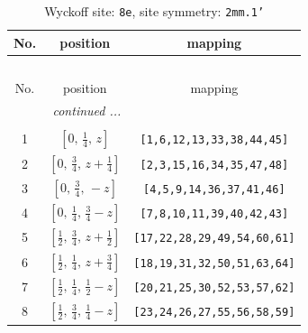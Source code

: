 \documentclass[fleqn,8pt]{jsarticle}
\begin{document}
\begin{longtable}{ccc}
\caption{Wyckoff site: {\tt 8e}, site symmetry: {\tt 2mm.1'}}
 \\
 \hline \hline
No. & position & mapping \\ \hline \endfirsthead

\multicolumn{2}{l}{\tablename\ \thetable{}} \\
 \hline \hline
No. & position & mapping \\ \hline \endhead

 \hline \hline
\multicolumn{2}{r}{\footnotesize\it continued ...} \\ \endfoot

 \hline \hline
\multicolumn{2}{r}{} \\ \endlastfoot

1 & $\left[ 0,\, \frac{1}{4},\, z \right]$ & {\tt [1,6,12,13,33,38,44,45]} \\ \hline
2 & $\left[ 0,\, \frac{3}{4},\, z + \frac{1}{4} \right]$ & {\tt [2,3,15,16,34,35,47,48]} \\ \hline
3 & $\left[ 0,\, \frac{3}{4},\, - z \right]$ & {\tt [4,5,9,14,36,37,41,46]} \\ \hline
4 & $\left[ 0,\, \frac{1}{4},\, \frac{3}{4} - z \right]$ & {\tt [7,8,10,11,39,40,42,43]} \\ \hline
5 & $\left[ \frac{1}{2},\, \frac{3}{4},\, z + \frac{1}{2} \right]$ & {\tt [17,22,28,29,49,54,60,61]} \\ \hline
6 & $\left[ \frac{1}{2},\, \frac{1}{4},\, z + \frac{3}{4} \right]$ & {\tt [18,19,31,32,50,51,63,64]} \\ \hline
7 & $\left[ \frac{1}{2},\, \frac{1}{4},\, \frac{1}{2} - z \right]$ & {\tt [20,21,25,30,52,53,57,62]} \\ \hline
8 & $\left[ \frac{1}{2},\, \frac{3}{4},\, \frac{1}{4} - z \right]$ & {\tt [23,24,26,27,55,56,58,59]} \\
\end{longtable}
\renewcommand{\arraystretch}{1.2}
\end{document}
